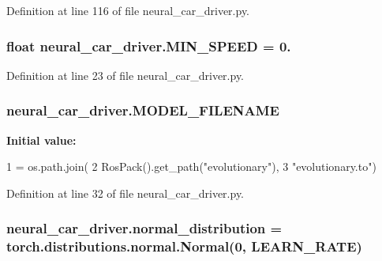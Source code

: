 Definition at line 116 of file neural\+\_\+car\+\_\+driver.\+py.

\subsubsection[{\texorpdfstring{M\+I\+N\+\_\+\+S\+P\+E\+ED}{MIN_SPEED}}]{\setlength{\rightskip}{0pt plus 5cm}float neural\+\_\+car\+\_\+driver.\+M\+I\+N\+\_\+\+S\+P\+E\+ED = 0.}\hypertarget{namespaceneural__car__driver_a5292cc13090a4c357e023f5732a8a18a}{}\label{namespaceneural__car__driver_a5292cc13090a4c357e023f5732a8a18a}


Definition at line 23 of file neural\+\_\+car\+\_\+driver.\+py.

\subsubsection[{\texorpdfstring{M\+O\+D\+E\+L\+\_\+\+F\+I\+L\+E\+N\+A\+ME}{MODEL_FILENAME}}]{\setlength{\rightskip}{0pt plus 5cm}neural\+\_\+car\+\_\+driver.\+M\+O\+D\+E\+L\+\_\+\+F\+I\+L\+E\+N\+A\+ME}\hypertarget{namespaceneural__car__driver_a067bf25e6557471566d69b477b79ade5}{}\label{namespaceneural__car__driver_a067bf25e6557471566d69b477b79ade5}
{\bfseries Initial value\+:}
\begin{DoxyCode}
1 = os.path.join(
2     RosPack().get\_path(\textcolor{stringliteral}{"evolutionary"}),
3     \textcolor{stringliteral}{"evolutionary.to"})
\end{DoxyCode}


Definition at line 32 of file neural\+\_\+car\+\_\+driver.\+py.

\subsubsection[{\texorpdfstring{normal\+\_\+distribution}{normal_distribution}}]{\setlength{\rightskip}{0pt plus 5cm}neural\+\_\+car\+\_\+driver.\+normal\+\_\+distribution = torch.\+distributions.\+normal.\+Normal(0, {\bf L\+E\+A\+R\+N\+\_\+\+R\+A\+TE})}\hypertarget{namespaceneural__car__driver_a953d05d55cd2232a21159009976855f3}{}\label{namespaceneural__car__driver_a953d05d55cd2232a21159009976855f3}


